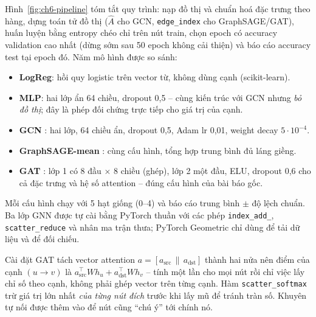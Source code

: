 Hình~\ref{fig:ch6-pipeline} tóm tắt quy trình: nạp đồ thị và chuẩn hoá đặc trưng theo hàng, dựng toán tử đồ thị ($\hat A$
cho GCN, \texttt{edge\_index} cho GraphSAGE/GAT), huấn luyện bằng entropy chéo chỉ trên nút train, chọn epoch có accuracy
validation cao nhất (dừng sớm sau 50 epoch không cải thiện) và báo cáo accuracy test tại epoch đó. Năm mô hình được so
sánh:
\begin{itemize}
  \item \textbf{LogReg}: hồi quy logistic trên vector từ, không dùng cạnh (scikit-learn).
  \item \textbf{MLP}: hai lớp ẩn 64 chiều, dropout 0,5 -- cùng kiến trúc với GCN nhưng \emph{bỏ đồ thị}; đây là phép đối
        chứng trực tiếp cho giá trị của cạnh.
  \item \textbf{GCN} \cite{ch6:kipf2017}: hai lớp, 64 chiều ẩn, dropout 0,5, Adam lr 0,01, weight decay $5\cdot10^{-4}$.
  \item \textbf{GraphSAGE-mean} \cite{ch6:hamilton2017}: cùng cấu hình, tổng hợp trung bình đủ láng giềng.
  \item \textbf{GAT} \cite{ch6:velickovic2018}: lớp 1 có 8 đầu $\times$ 8 chiều (ghép), lớp 2 một đầu, ELU, dropout 0,6
        cho cả đặc trưng và hệ số attention -- đúng cấu hình của bài báo gốc.
\end{itemize}
Mỗi cấu hình chạy với 5 hạt giống (0--4) và báo cáo trung bình $\pm$ độ lệch chuẩn. Ba lớp GNN được tự cài bằng PyTorch
thuần với các phép \texttt{index\_add\_}, \texttt{scatter\_reduce} và nhân ma trận thưa; PyTorch Geometric
\cite{ch6:fey2019pyg} chỉ dùng để tải dữ liệu và để đối chiếu.



Cài đặt GAT tách vector attention $a=[a_{\text{src}}\,\|\,a_{\text{dst}}]$ thành hai nửa nên điểm của cạnh $(u\to v)$ là
$a_{\text{src}}^{\top}Wh_u + a_{\text{dst}}^{\top}Wh_v$ -- tính một lần cho mọi nút rồi chỉ việc lấy chỉ số theo cạnh, không
phải ghép vector trên từng cạnh. Hàm \texttt{scatter\_softmax} trừ giá trị lớn nhất \emph{của từng nút đích} trước khi lấy
mũ để tránh tràn số. Khuyên tự nối được thêm vào để nút cũng ``chú ý'' tới chính nó.

